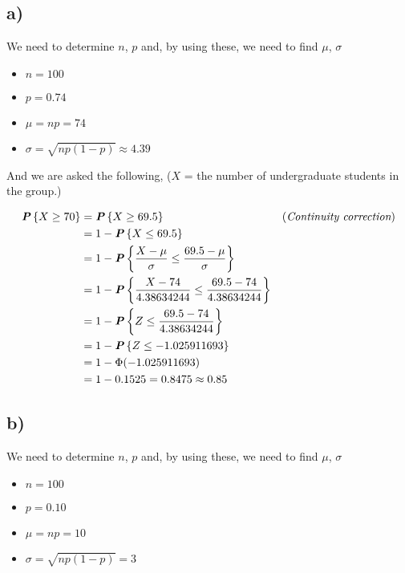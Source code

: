 \subsection*{a)}

We need to determine $n$, $p$ and, by using these, we need to find $\mu$, $\sigma$

\begin{multicols}{2}
  \begin{itemize}
    \item $n = 100$
    \item $p = 0.74$
    \item $\mu = np = 74$
    \item $\sigma = \sqrt{np(1-p)} \approx 4.39$
  \end{itemize}
\end{multicols}

And we are asked the following, ($X$ = the number of undergraduate students in the group.)

\begin{align*}
  \textbf{\textit{P}}\left\{X \geq 70\right\} &= \textbf{\textit{P}}\left\{X \geq 69.5\right\} &(\textit{Continuity correction})\\
  &= 1 - \textbf{\textit{P}}\left\{X \leq 69.5\right\}\\
  &= 1 - \textbf{\textit{P}}\left\{\dfrac{X - \mu}{\sigma} \leq \dfrac{69.5 - \mu}{\sigma}\right\}\\
  &= 1 - \textbf{\textit{P}}\left\{\dfrac{X - 74}{4.38634244} \leq \dfrac{69.5 - 74}{4.38634244}\right\}\\
  &= 1 - \textbf{\textit{P}}\left\{Z \leq \dfrac{69.5 - 74}{4.38634244}\right\}\\
  &= 1 - \textbf{\textit{P}}\left\{Z \leq - 1.025911693\right\}\\
  &= 1 - \Phi(- 1.025911693)\\
  &= 1 - 0.1525 = 0.8475 \approx 0.85
\end{align*}

\newpage
\subsection*{b)}

We need to determine $n$, $p$ and, by using these, we need to find $\mu$, $\sigma$

\begin{multicols}{2}
  \begin{itemize}
    \item $n = 100$
    \item $p = 0.10$
    \item $\mu = np = 10$
    \item $\sigma = \sqrt{np(1-p)} = 3$
  \end{itemize}
\end{multicols}

